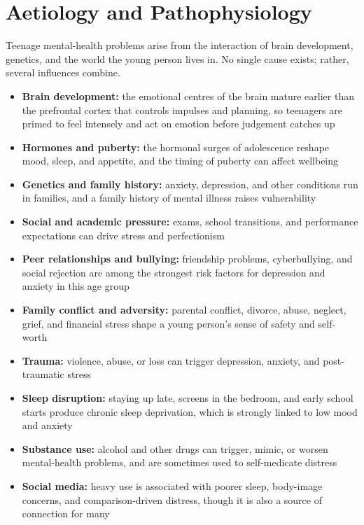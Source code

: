 \section*{Aetiology and Pathophysiology}
Teenage mental-health problems arise from the interaction of brain development, genetics, and the world the young person lives in. No single cause exists; rather, several influences combine.
\begin{itemize}
    \item \textbf{Brain development:} the emotional centres of the brain mature earlier than the prefrontal cortex that controls impulses and planning, so teenagers are primed to feel intensely and act on emotion before judgement catches up
    \item \textbf{Hormones and puberty:} the hormonal surges of adolescence reshape mood, sleep, and appetite, and the timing of puberty can affect wellbeing
    \item \textbf{Genetics and family history:} anxiety, depression, and other conditions run in families, and a family history of mental illness raises vulnerability
    \item \textbf{Social and academic pressure:} exams, school transitions, and performance expectations can drive stress and perfectionism
    \item \textbf{Peer relationships and bullying:} friendship problems, cyberbullying, and social rejection are among the strongest risk factors for depression and anxiety in this age group
    \item \textbf{Family conflict and adversity:} parental conflict, divorce, abuse, neglect, grief, and financial stress shape a young person's sense of safety and self-worth
    \item \textbf{Trauma:} violence, abuse, or loss can trigger depression, anxiety, and post-traumatic stress
    \item \textbf{Sleep disruption:} staying up late, screens in the bedroom, and early school starts produce chronic sleep deprivation, which is strongly linked to low mood and anxiety
    \item \textbf{Substance use:} alcohol and other drugs can trigger, mimic, or worsen mental-health problems, and are sometimes used to self-medicate distress
    \item \textbf{Social media:} heavy use is associated with poorer sleep, body-image concerns, and comparison-driven distress, though it is also a source of connection for many
\end{itemize}

